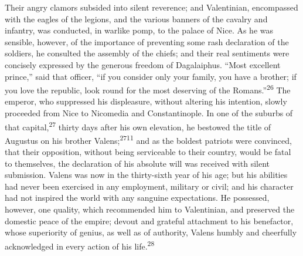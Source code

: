 Their angry clamors subsided into silent reverence; and
Valentinian, encompassed with the eagles of the legions, and the
various banners of the cavalry and infantry, was conducted, in
warlike pomp, to the palace of Nice. As he was sensible, however,
of the importance of preventing some rash declaration of the
soldiers, he consulted the assembly of the chiefs; and their real
sentiments were concisely expressed by the generous freedom of
Dagalaiphus. “Most excellent prince,” said that officer, “if you
consider only your family, you have a brother; if you love the
republic, look round for the most deserving of the Romans.”\textsuperscript{26}
The emperor, who suppressed his displeasure, without altering his
intention, slowly proceeded from Nice to Nicomedia and
Constantinople. In one of the suburbs of that capital,\textsuperscript{27} thirty
days after his own elevation, he bestowed the title of Augustus
on his brother Valens;\textsuperscript{2711} and as the boldest patriots were
convinced, that their opposition, without being serviceable to
their country, would be fatal to themselves, the declaration of
his absolute will was received with silent submission. Valens was
now in the thirty-sixth year of his age; but his abilities had
never been exercised in any employment, military or civil; and
his character had not inspired the world with any sanguine
expectations. He possessed, however, one quality, which
recommended him to Valentinian, and preserved the domestic peace
of the empire; devout and grateful attachment to his benefactor,
whose superiority of genius, as well as of authority, Valens
humbly and cheerfully acknowledged in every action of his life.\textsuperscript{28}




